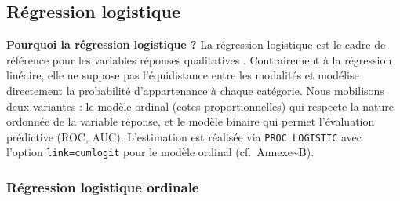 \documentclass[11pt,a4paper]{memoirerecherche}
\begin{document}
\hypertarget{sec-logistique}{%
\subsection{Régression logistique}\label{sec-logistique}}

\textbf{Pourquoi la régression logistique ?} La régression logistique est le cadre de référence pour les variables réponses qualitatives \autocite{agresti2010}. Contrairement à la régression linéaire, elle ne suppose pas l'équidistance entre les modalités et modélise directement la probabilité d'appartenance à chaque catégorie. Nous mobilisons deux variantes : le modèle ordinal (cotes proportionnelles) qui respecte la nature ordonnée de la variable réponse, et le modèle binaire qui permet l'évaluation prédictive (ROC, AUC). L'estimation est réalisée via \texttt{PROC\ LOGISTIC} avec l'option \texttt{link=cumlogit} pour le modèle ordinal (cf.~Annexe\textasciitilde B).

\hypertarget{ruxe9gression-logistique-ordinale}{%
\subsubsection{Régression logistique ordinale}\label{ruxe9gression-logistique-ordinale}}
\end{document}
